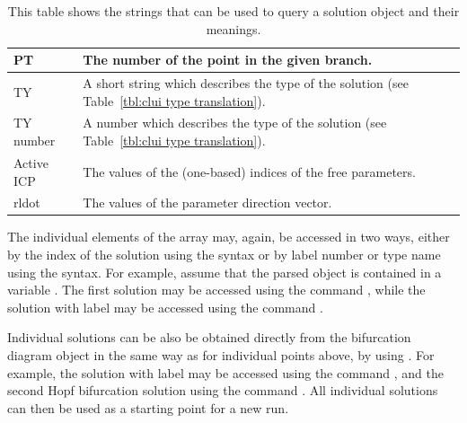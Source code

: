 \documentclass[12pt]{report}
\begin{document}
\begin{table}[htbp]
\begin{center}
\begin{tabular}{| l | l |}
 \hline
 PT & \begin{minipage}{4in} \smallskip The number of the point in the given branch.  \smallskip \end{minipage} \\  
 \hline
 TY & \begin{minipage}{4in} \smallskip A short string which describes the type of the solution (see Table~\ref{tbl:clui type translation}). \smallskip \end{minipage} \\  
 \hline
 TY number & \begin{minipage}{4in} \smallskip A number which describes the type of the solution (see Table~\ref{tbl:clui type translation}).  \smallskip \end{minipage} \\  
 \hline
 Active ICP & \begin{minipage}{4in} \smallskip
 The values of the (one-based) indices of the free parameters.
 \smallskip \end{minipage} \\  
 \hline
 rldot & \begin{minipage}{4in} \smallskip The values
 of the parameter direction vector.\smallskip \end{minipage} \\  
 \hline
 \end{tabular}
 \caption[Contents of a solution object.]
 {This table shows the strings that can be used to
 query a solution object and their
 meanings.}
 \label{tbl:clui parse solution}
 \end{center}
 \end{table}

 The individual elements of the array may, again, be accessed 
 in two ways, either by the index of the solution using the
 \commandf{[]} syntax or by label number or type name using the
 \commandf{()} syntax.  For example, assume that the parsed object is contained
 in a variable .
 The first solution may be accessed 
 using the command , while the solution with
 label  may be accessed using the command .

 Individual solutions can be also be obtained directly from the
 bifurcation diagram object  in the same way as for
 individual points above, by using .
 For example, the solution with label  may be accessed
 using the command
 , and the second Hopf bifurcation solution using
 the command .
 All individual solutions can then be used as a starting point for a new run.
\end{document}
